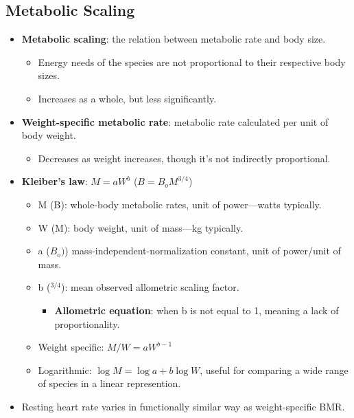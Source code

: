 \documentclass[12pt,a4paper]{article}
\begin{document}
\subsection{Metabolic Scaling}
\begin{itemize}
    \item \textbf{Metabolic scaling}: the relation between metabolic rate and body size.
        \begin{itemize}
            \item Energy needs of the species are not proportional to their respective body sizes.
            \item Increases as a whole, but less significantly.
        \end{itemize}
    \item \textbf{Weight-specific metabolic rate}: metabolic rate calculated per unit of body weight.
        \begin{itemize}
            \item Decreases as weight increases, though it's not indirectly proportional.
        \end{itemize}
    \item \textbf{Kleiber's law}: \emph{\(M=aW^b\)} (\(B=B_oM^{3/4}\))
        \begin{itemize}
            \item M (B): whole-body metabolic rates, unit of power---watts typically.
            \item W (M): body weight, unit of mass---kg typically.
            \item a (\(B_o)\)) mass-independent-normalization constant, unit of power/unit of mass.
            \item b (\(^{3/4}\)): mean observed allometric scaling factor. 
                \begin{itemize}
                    \item \textbf{Allometric equation}: when b is not equal to 1, meaning a lack of proportionality.
                \end{itemize}
            \item Weight specific: \(M/W=aW^{b-1}\)
            \item Logarithmic: \(\log{M} = \log{a+b}\log{W}\), useful for comparing a wide range of species in a linear represention.
        \end{itemize}
    \item Resting heart rate varies in functionally similar way as weight-specific BMR.
        \begin{itemize}

\end{itemize}
\end{itemize}
\end{document}

